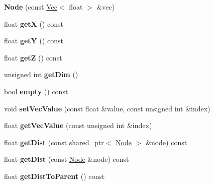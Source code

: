 \begin{DoxyCompactItemize}
\item 
\hypertarget{class_node_a29f8f2670cd2ce5fdbdc200c85d8cb71}{{\bfseries Node} (const \hyperlink{class_vec}{Vec}$<$ float $>$ \&vec)}\label{class_node_a29f8f2670cd2ce5fdbdc200c85d8cb71}

\item 
\hypertarget{class_node_aec879abd3300422ebfa014908432d47b}{float {\bfseries get\-X} () const }\label{class_node_aec879abd3300422ebfa014908432d47b}

\item 
\hypertarget{class_node_ad29f9632ca8d71eedeeb5fd8c96dff1e}{float {\bfseries get\-Y} () const }\label{class_node_ad29f9632ca8d71eedeeb5fd8c96dff1e}

\item 
\hypertarget{class_node_a386248330119d5b003e6a41f51fbe4b1}{float {\bfseries get\-Z} () const }\label{class_node_a386248330119d5b003e6a41f51fbe4b1}

\item 
\hypertarget{class_node_a169a154e1ada22003acea7a95553bbd8}{unsigned int {\bfseries get\-Dim} ()}\label{class_node_a169a154e1ada22003acea7a95553bbd8}

\item 
\hypertarget{class_node_abfe17e7be0efb32246a6fffad333ed9a}{bool {\bfseries empty} () const }\label{class_node_abfe17e7be0efb32246a6fffad333ed9a}

\item 
\hypertarget{class_node_aea90bb1051adfa9bcb2e736854ff03b3}{void {\bfseries set\-Vec\-Value} (const float \&value, const unsigned int \&index)}\label{class_node_aea90bb1051adfa9bcb2e736854ff03b3}

\item 
\hypertarget{class_node_a20b64482645b17e1fdf2b374513e119e}{float {\bfseries get\-Vec\-Value} (const unsigned int \&index)}\label{class_node_a20b64482645b17e1fdf2b374513e119e}

\item 
\hypertarget{class_node_a4c537515257bb0a1ebcbfb7e8d06186d}{float {\bfseries get\-Dist} (const shared\-\_\-ptr$<$ \hyperlink{class_node}{Node} $>$ \&node) const }\label{class_node_a4c537515257bb0a1ebcbfb7e8d06186d}

\item 
\hypertarget{class_node_a236f1b02291f54812c5fd682a46dd1fe}{float {\bfseries get\-Dist} (const \hyperlink{class_node}{Node} \&node) const }\label{class_node_a236f1b02291f54812c5fd682a46dd1fe}

\item 
\hypertarget{class_node_a2c628af3afb6b890e6524ce84f916386}{float {\bfseries get\-Dist\-To\-Parent} () const }\label{class_node_a2c628af3afb6b890e6524ce84f916386}


\end{DoxyCompactItemize}
